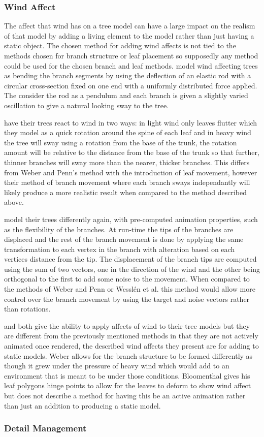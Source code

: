 \documentclass[review]{cmpreport}
\begin{document}
\subsubsection{Wind Affect}
The affect that wind has on a tree model can have a large impact on the realism of that model 
by adding a living element to the model rather than just having a static object. The chosen 
method for adding wind affects is not tied to the methods chosen for branch structure or leaf 
placement so supposedly any method could be used for the chosen branch and leaf methods.
\cite{weber1995rendering} model wind affecting trees as bending the branch segments by using 
the deflection of an elastic rod with a circular cross-section fixed on one end with a 
uniformly distributed force applied. The consider the rod as a pendulum and each branch is 
given a slightly varied oscillation to give a natural looking sway to the tree. \par
\cite{wesslen2005real} have their trees react to wind in two ways: in light wind only leaves 
flutter which they model as a quick rotation around the spine of each leaf and in heavy 
wind the tree will sway using a rotation from the base of the trunk, the rotation amount will 
be relative to the distance from the base of the trunk so that further, thinner branches will 
sway more than the nearer, thicker branches. This differs from Weber and Penn's method with the 
introduction of leaf movement, however their method of branch movement where each branch 
sways independantly will likely produce a more realistic result when compared to the method 
described above.\par
\cite{candussi2005rendering} model their trees differently again, with pre-computed animation 
properties, such as the flexibility of the branches. At run-time the tips of the branches are 
displaced and the rest of the branch movement is done by applying the same transformation to 
each vertex in the branch with alteration based on each vertices distance from the tip. The 
displacement of the branch tips are computed using the sum of two vectors, one in the direction 
of the wind and the other being orthogonal to the first to add some noise to the movement. 
When compared to the methods of Weber and Penn or Wessl{\'e}n et al. this method would allow 
more control over the branch movement by using the target and noise vectors rather than rotations.\par
\cite{weber2008simulation} and \cite{bloomenthal1985modeling} both give the ability to apply 
affects of wind to their tree models but they are different from the previously mentioned methods 
in that they are not actively animated once rendered, the described wind affects they present 
are for adding to static models. Weber allows for the branch structure to be formed differently 
as though it grew under the pressure of heavy wind which would add to an environment that is 
meant to be under those conditions. Bloomenthal gives his leaf polygons hinge points to allow 
for the leaves to deform to show wind affect but does not describe a method for having this 
be an active animation rather than just an addition to producing a static model.

\subsubsection{Detail Management}


\clearpage

\end{document}
